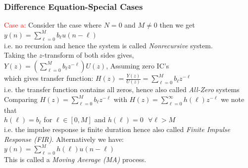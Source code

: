 \documentclass[mathserif, 10pt]{beamer} %
\begin{document}
\frame
{

\normalsize

\frametitle{Difference Equation-Special Cases}

\textcolor{red}{Case a:} Consider the case where $N=0$ and $M \ne 0$ then we get\\
$y(n) = \sum\limits_{\ell=0}^M b_{\ell} u(n-\ell)$ \\
i.e. no recursion and hence the system is called \textit{Nonrecursive} system. \\

Taking the $z$-transform of both sides gives,\\
$Y(z) = (\sum\limits_{\ell=0}^M b_{\ell} z^{-\ell}) U(z)$, Assuming zero IC's\\
which gives transfer function:
$H(z) = \frac{Y(z)}{U(z)}=\sum\limits_{\ell = 0}^M b_{\ell} z^{-\ell}$\\

i.e. the transfer function contains all zeros, hence also called \textit{All-Zero }systems  \\

Comparing $H(z) =\sum\limits_{\ell = 0}^M b_{\ell} z^{-\ell}$ with  $H(z) = \sum\limits_{\ell =0}^{\infty} h(\ell) z^{-\ell}$ we note that \\

 $h(\ell) = b_{\ell}$ for $\ell \in[0, M]$ and $h(\ell) = 0~~~\forall \ell >M$\\

i.e. the impulse response is finite duration hence also called \textit{Finite Impulse Response (FIR)}. Alternatively we have:\\
$y(n) = \sum\limits_{\ell = 0}^M h(\ell) u(n-\ell)$\\

This is called a \textit{Moving Average (MA)} process.
}

\end{document}
